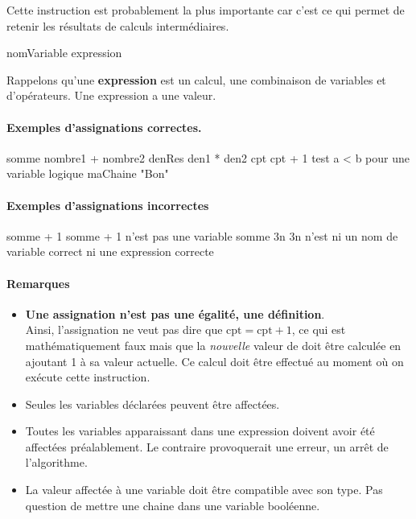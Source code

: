 			Cette instruction est probablement la plus importante
			car c'est ce qui permet de retenir les résultats 
			de calculs intermédiaires.
			
			\begin{LDA}
			\Let nomVariable \Gets expression
			\end{LDA}
				
			Rappelons qu’une \textbf{expression} 
			est un calcul, une combinaison de variables et
			d’opérateurs. Une expression a une valeur.
					
			\paragraph{Exemples d'assignations correctes.}
				
				\begin{LDA}
				\Let somme \Gets nombre1 + nombre2
				\Let denRes \Gets den1 * den2
				\Let cpt \Gets cpt + 1
				\Let test \Gets a < b \RComment pour une variable logique
				\Let maChaine \Gets "Bon"
				\end{LDA}
				
			\paragraph{Exemples d'assignations incorrectes}
				\begin{LDA}
				\Let somme + 1 \Gets 3
				\RComment somme + 1 n’est pas une variable
				\Let somme \Gets 3n
				\RComment 3n n’est ni un nom de variable correct ni une expression correcte
				\end{LDA}
				
			\paragraph{Remarques}
			
				\begin{itemize}
				\item 
					\textbf{Une assignation n'est pas une égalité, une définition}.
					\\Ainsi, l'assignation \lda{cpt \Gets cpt + 1}
					ne veut pas dire que $\textrm{cpt} = \textrm{cpt} + 1$,
					ce qui est mathématiquement faux 
					mais que la \emph{nouvelle} valeur de 
					doit être calculée en ajoutant 1 à sa valeur actuelle.
					Ce calcul doit être effectué au moment 
					où on exécute cette instruction. 
				\item 
					Seules les variables déclarées peuvent être affectées.
				\item 
					Toutes les variables apparaissant dans une expression
					doivent avoir été affectées préalablement. 
					Le contraire provoquerait une erreur,
					un arrêt de l’algorithme.
				\item 
					La valeur affectée à une variable 
					doit être compatible avec son type.
					Pas question de mettre une chaine dans une variable
					booléenne.
				\end{itemize}
				
